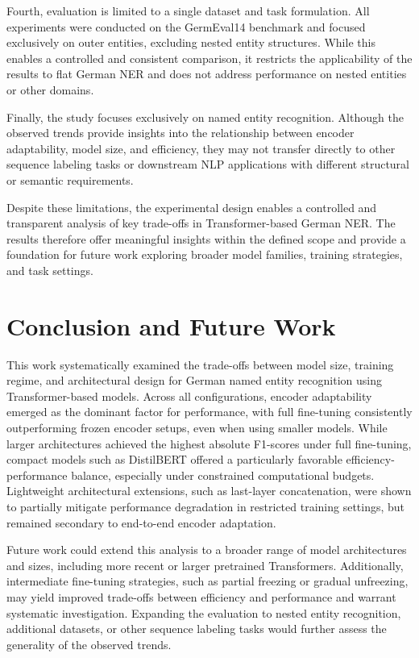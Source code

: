 \documentclass[11pt,a4paper,twocolumn]{article}
\begin{document}
Fourth, evaluation is limited to a single dataset and task formulation. All experiments were conducted on the GermEval14 benchmark and focused exclusively on outer entities, excluding nested entity structures. While this enables a controlled and consistent comparison, it restricts the applicability of the results to flat German NER and does not address performance on nested entities or other domains.

Finally, the study focuses exclusively on named entity recognition. Although the observed trends provide insights into the relationship between encoder adaptability, model size, and efficiency, they may not transfer directly to other sequence labeling tasks or downstream NLP applications with different structural or semantic requirements.

Despite these limitations, the experimental design enables a controlled and transparent analysis of key trade-offs in Transformer-based German NER. The results therefore offer meaningful insights within the defined scope and provide a foundation for future work exploring broader model families, training strategies, and task settings.


\section{Conclusion and Future Work}

This work systematically examined the trade-offs between model size, training regime, and architectural design for German named entity recognition using Transformer-based models. Across all configurations, encoder adaptability emerged as the dominant factor for performance, with full fine-tuning consistently outperforming frozen encoder setups, even when using smaller models. While larger architectures achieved the highest absolute F1-scores under full fine-tuning, compact models such as DistilBERT offered a particularly favorable efficiency-performance balance, especially under constrained computational budgets. Lightweight architectural extensions, such as last-layer concatenation, were shown to partially mitigate performance degradation in restricted training settings, but remained secondary to end-to-end encoder adaptation.

Future work could extend this analysis to a broader range of model architectures and sizes, including more recent or larger pretrained Transformers. Additionally, intermediate fine-tuning strategies, such as partial freezing or gradual unfreezing, may yield improved trade-offs between efficiency and performance and warrant systematic investigation. Expanding the evaluation to nested entity recognition, additional datasets, or other sequence labeling tasks would further assess the generality of the observed trends.
\end{document}

